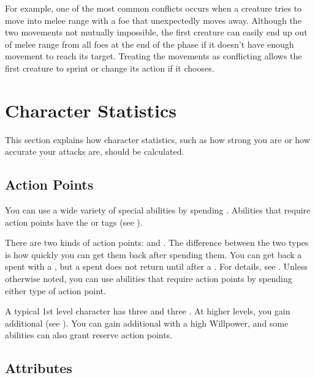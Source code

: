             For example, one of the most common conflicts occurs when a creature tries to move into melee range with a foe that unexpectedly moves away.
            Although the two movements not mutually impossible, the first creature can easily end up out of melee range from all foes at the end of the phase if it doesn't have enough movement to reach its target.
            Treating the movements as conflicting allows the first creature to sprint or change its action if it chooses.

\section{Character Statistics}
    This section explains how character statistics, such as how strong you are or how accurate your attacks are, should be calculated.

    \subsection{Action Points}\label{Action Points}
        You can use a wide variety of special abilities by spending .
        Abilities that require action points have the  or  tags (see ).

        There are two kinds of action points:  and .
        The difference between the two types is how quickly you can get them back after spending them.
        You can get back a spent  with a ,
            but a spent  does not return until after a .
        For details, see .
        Unless otherwise noted, you can use abilities that require action points by spending either type of action point.

        A typical 1st level character has three  and three .
        At higher levels, you gain additional  (see ).
        You can gain additional  with a high Willpower, and some abilities can also grant reserve action points.

    \subsection{Attributes}\label{Attributes}

